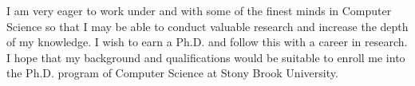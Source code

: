 \documentclass[12pt]{article}
\newcommand{\w}{2mm}
\begin{document}
\vspace{\w}

I am very eager to work under and with some of the finest minds in Computer Science so that I may be 
able to conduct valuable research and increase the depth of my knowledge. I wish to earn a Ph.D. and 
follow this with a career in research. I hope that my background and qualifications would be suitable to 
enroll me into the Ph.D. program of Computer Science at Stony Brook University. 
\end{document}
